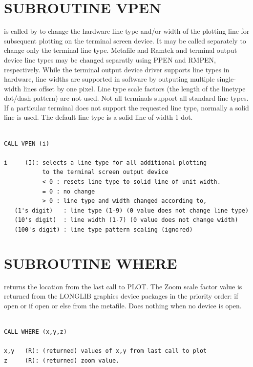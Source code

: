 \documentclass[11pt]{report}
\begin{document}
\section{SUBROUTINE VPEN}

 is called by  to change the hardware line type and/or width of
the plotting line for subsequent plotting on the terminal screen device.
It may be called separately to change only the terminal line type.
Metafile and Ramtek and terminal output device line types may be changed 
separatly using PPEN and RMPEN, respectively.  While the terminal output
device driver supports line types in hardware, line widths are supported in
software by outputing multiple single-width lines offset by one pixel.
Line type scale factors (the length of the linetype
dot/dash pattern) are not used.  Not all terminals support all
standard line types.  If a particular terminal does not support the
requested line type, normally a solid line is used.
The default line type is a solid line of width 1 dot.
\begin{verbatim}

CALL VPEN (i)

i     (I): selects a line type for all additional plotting
           to the terminal screen output device
           < 0 : resets line type to solid line of unit width.
           = 0 : no change 
           > 0 : line type and width changed according to,
   (1's digit)   : line type (1-9) (0 value does not change line type)
   (10's digit)  : line width (1-7) (0 value does not change width)
   (100's digit) : line type pattern scaling (ignored)
\end{verbatim}

\section{SUBROUTINE WHERE}

 returns the location from the last call to PLOT. 
The Zoom scale factor value is returned from the LONGLIB graphics device
packages in the priority order:  if open or  if open or
else from the metafile.  Does nothing when no device is open.
\begin{verbatim}

CALL WHERE (x,y,z)

x,y   (R): (returned) values of x,y from last call to plot
z     (R): (returned) zoom value.
\end{verbatim}
\end{document}
